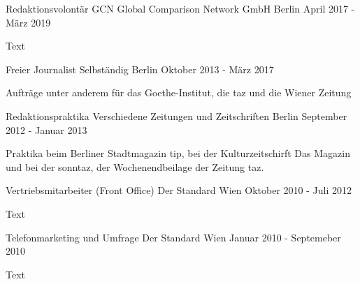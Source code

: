 \begin{cventries}
  \cventry
    {Redaktionsvolontär} %
    {GCN Global Comparison Network GmbH} %
    {Berlin} %
    {April 2017 - März 2019} %
    {
      \begin{cvitems} %
        \item {Text}
       \end{cvitems}
    }

  \cventry
    {Freier Journalist} %
    {Selbständig} %
    {Berlin} %
    {Oktober 2013 - März 2017} %
    {
      \begin{cvitems} %
        \item {Aufträge unter anderem für das Goethe-Institut, die taz und die Wiener Zeitung}
       \end{cvitems}
    }

 \cventry
    {Redaktionspraktika} %
    {Verschiedene Zeitungen und Zeitschriften} %
    {Berlin} %
    {September 2012 - Januar 2013} %
    { 
      \begin{cvitems} %
        \item {Praktika beim Berliner Stadtmagazin tip, bei der Kulturzeitschirft Das Magazin und bei der sonntaz, der Wochenendbeilage der Zeitung taz.}
      \end{cvitems}
    }

  \cventry
    {Vertriebsmitarbeiter (Front Office)} %
    {Der Standard} %
    {Wien} %
    {Oktober 2010 - Juli 2012} %
    {
      \begin{cvitems} %
        \item {Text}
      \end{cvitems}
    }

\cventry
{Telefonmarketing und Umfrage} %
{Der Standard} %
{Wien} %
{Januar 2010 - Septemeber 2010} %
{
  \begin{cvitems} %
    \item {Text}
  \end{cvitems}
}

\end{cventries}
